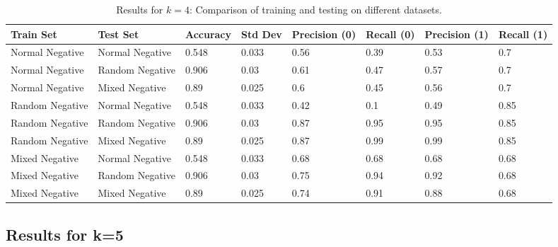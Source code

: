 \documentclass[11pt, a4paper, hidelinks]{article}
\begin{document}
\begin{table}[H]
    \centering
    \begin{tabular}{|l|l|l|l|l|l|l|l|}
        \hline
        \textbf{Train Set} & \textbf{Test Set} & \textbf{Accuracy} & \textbf{Std Dev} & \textbf{Precision (0)} & \textbf{Recall (0)} & \textbf{Precision (1)} & \textbf{Recall (1)} \\
        \hline
        Normal Negative & Normal Negative & 0.548 & 0.033 & 0.56 & 0.39 & 0.53 & 0.7 \\
        \hline
        Normal Negative & Random Negative & 0.906 & 0.03 & 0.61 & 0.47 & 0.57 & 0.7 \\
        \hline
        Normal Negative & Mixed Negative & 0.89 & 0.025 & 0.6 & 0.45 & 0.56 & 0.7 \\
        \hline
        Random Negative & Normal Negative & 0.548 & 0.033 & 0.42 & 0.1 & 0.49 & 0.85 \\
        \hline
        Random Negative & Random Negative & 0.906 & 0.03 & 0.87 & 0.95 & 0.95 & 0.85 \\
        \hline
        Random Negative & Mixed Negative & 0.89 & 0.025 & 0.87 & 0.99 & 0.99 & 0.85 \\
        \hline
        Mixed Negative & Normal Negative & 0.548 & 0.033 & 0.68 & 0.68 & 0.68 & 0.68 \\
        \hline
        Mixed Negative & Random Negative & 0.906 & 0.03 & 0.75 & 0.94 & 0.92 & 0.68 \\
        \hline
        Mixed Negative & Mixed Negative & 0.89 & 0.025 & 0.74 & 0.91 & 0.88 & 0.68 \\
        \hline
    \end{tabular}
    \caption{Results for \(k = 4\): Comparison of training and testing on different datasets.}
    \label{tab:results_k4}
\end{table}

\subsection{Results for k=5}\label{subsec:results-for-k=5}
\end{document}
